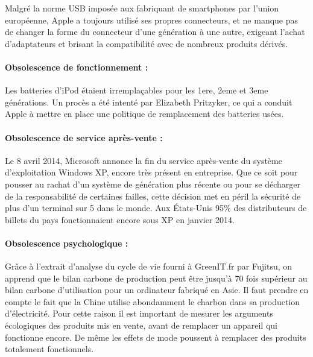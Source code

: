 Malgré la norme USB imposée aux fabriquant de smartphones par l’union européenne, Apple a toujours utilisé ses propres connecteurs, et ne manque pas de changer la forme du connecteur d’une génération à une autre, exigeant l'achat d'adaptateurs et brisant la compatibilité avec de nombreux produits dérivés.

\paragraph*{Obsolescence de fonctionnement :}

Les batteries d’iPod étaient irremplaçables pour les 1ere, 2eme et 3eme générations. Un procès a été intenté par Elizabeth Pritzyker, ce qui a conduit Apple à mettre en place une politique de remplacement des batteries usées.

\paragraph*{Obsolescence de service après-vente :}

Le 8 avril 2014, Microsoft annonce la fin du service après-vente du système d’exploitation Windows XP, encore très présent en entreprise. Que ce soit pour pousser au rachat d’un système de génération plus récente ou pour se décharger de la responsabilité de certaines failles, cette décision met en péril la sécurité de plus d'un terminal sur 5 dans le monde. Aux États-Unis 95\% des distributeurs de billets du pays fonctionnaient encore sous XP en janvier 2014.

\paragraph*{Obsolescence psychologique :}

Grâce à l’extrait d’analyse du cycle de vie fourni à GreenIT.fr par Fujitsu, on apprend que le bilan carbone de production peut être jusqu’à 70 fois supérieur au bilan carbone d’utilisation pour un ordinateur fabriqué en Asie. Il faut prendre en compte le fait que la Chine utilise abondamment le charbon dans sa production d'électricité. Pour cette raison il est important de mesurer les arguments écologiques des produits mis en vente, avant de remplacer un appareil qui fonctionne encore. De même les effets de mode poussent à remplacer des produits totalement fonctionnels.
